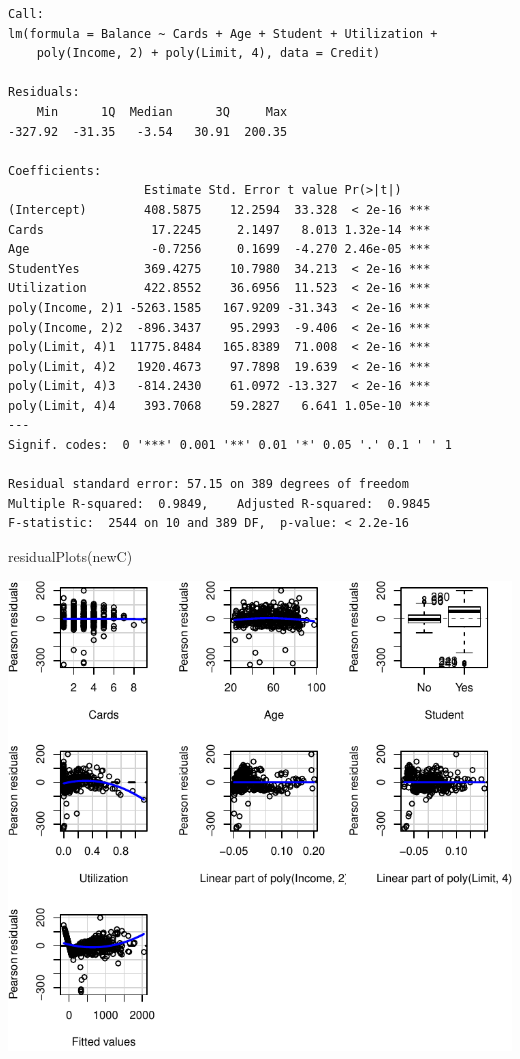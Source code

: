 \documentclass[
]{article}
\newenvironment{Shaded}{\begin{snugshade}}{\end{snugshade}}
\newcommand{\FunctionTok}[1]{\textcolor[rgb]{0.00,0.00,0.00}{#1}}
\newcommand{\NormalTok}[1]{#1}
\begin{document}
\begin{verbatim}
Call:
lm(formula = Balance ~ Cards + Age + Student + Utilization + 
    poly(Income, 2) + poly(Limit, 4), data = Credit)

Residuals:
    Min      1Q  Median      3Q     Max 
-327.92  -31.35   -3.54   30.91  200.35 

Coefficients:
                   Estimate Std. Error t value Pr(>|t|)    
(Intercept)        408.5875    12.2594  33.328  < 2e-16 ***
Cards               17.2245     2.1497   8.013 1.32e-14 ***
Age                 -0.7256     0.1699  -4.270 2.46e-05 ***
StudentYes         369.4275    10.7980  34.213  < 2e-16 ***
Utilization        422.8552    36.6956  11.523  < 2e-16 ***
poly(Income, 2)1 -5263.1585   167.9209 -31.343  < 2e-16 ***
poly(Income, 2)2  -896.3437    95.2993  -9.406  < 2e-16 ***
poly(Limit, 4)1  11775.8484   165.8389  71.008  < 2e-16 ***
poly(Limit, 4)2   1920.4673    97.7898  19.639  < 2e-16 ***
poly(Limit, 4)3   -814.2430    61.0972 -13.327  < 2e-16 ***
poly(Limit, 4)4    393.7068    59.2827   6.641 1.05e-10 ***
---
Signif. codes:  0 '***' 0.001 '**' 0.01 '*' 0.05 '.' 0.1 ' ' 1

Residual standard error: 57.15 on 389 degrees of freedom
Multiple R-squared:  0.9849,    Adjusted R-squared:  0.9845 
F-statistic:  2544 on 10 and 389 DF,  p-value: < 2.2e-16
\end{verbatim}

\begin{Shaded}
\begin{Highlighting}[]
\FunctionTok{residualPlots}\NormalTok{(newC)}
\end{Highlighting}
\end{Shaded}

\begin{center}\includegraphics{SDM-CHAP24_files/figure-latex/unnamed-chunk-4-1} \end{center}
\end{document}
